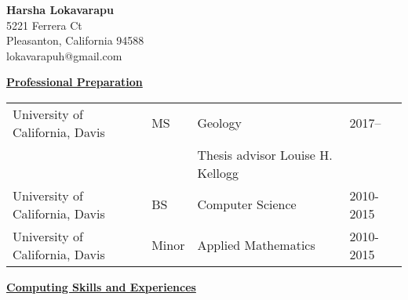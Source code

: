 \documentclass[11pt]{ltxdoc}
\begin{document}
\begin{center}
  \textbf{Harsha Lokavarapu}      \\ [06pt]
  5221 Ferrera Ct                 \\
  Pleasanton, California 94588    \\
  lokavarapuh@gmail.com           \\  [3pt]
\end{center}


\vskip 12pt

\begin{center}
	\textbf{\underline{Professional Preparation}}
\end{center}

\vskip -06pt

\begin{tabular}{llll}
University of California, Davis              &MS     &Geology       & 2017-- \\
                                             &       &Thesis advisor Louise H. Kellogg &  \\
University of California, Davis              &BS     &Computer Science  & 2010-2015       \\
University of California, Davis              &Minor   &Applied Mathematics & 2010-2015
\end{tabular}

\vskip 18pt

\begin{center}
	\textbf{\underline{Computing Skills and Experiences}}
\end{center}
\end{document}
